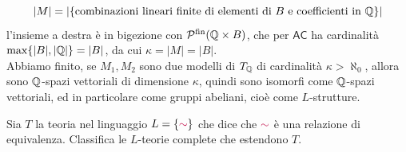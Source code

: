 \begin{soln}
\begin{enumerate}
        \[ |M| = |\{\text{combinazioni lineari finite di elementi di $B$ e coefficienti in $\mathbb Q$}\}| \]
        l'insieme a destra è in bigezione con $\mathcal{P}^{\text{fin}}(\mathbb Q \times B)$, che per $\mathsf{AC}$ ha cardinalità $\max\{|B|,|\mathbb Q|\} = |B|$, da cui $\kappa = |M| = |B|$.\\
        Abbiamo finito, se $M_1, M_2$ sono due modelli di $T_{\mathbb Q}$ di cardinalità $\kappa > \aleph_0$, allora sono $\mathbb Q$-spazi vettoriali di dimensione $\kappa$, quindi sono isomorfi come $\mathbb Q$-spazi vettoriali, ed in particolare come gruppi abeliani, cioè come $L$-strutture.
    \end{enumerate}
\end{soln}

\begin{exercise}
    Sia $T$ la teoria nel linguaggio $L = \{\textcolor{purple}{\sim}\}$ che dice che $\textcolor{purple}{\sim}$ è una relazione di equivalenza.
    Classifica le $L$-teorie complete che estendono $T$.
\end{exercise}

